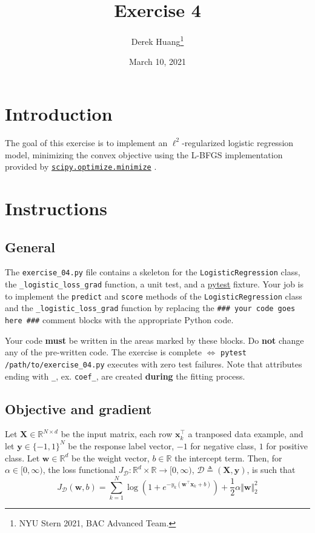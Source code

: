 \documentclass{article}
\title{Exercise 4}
\author{Derek Huang\thanks{NYU Stern 2021, BAC Advanced Team.}}
\date{March 10, 2021}
\numberwithin{equation}{section}
\newcommand{\pytest}{\href{https://docs.pytest.org/en/stable/}{pytest}}
\newcommand{\minimize}{%
    \href{%
        https://docs.scipy.org/doc/scipy/reference/generated/%
        scipy.optimize.minimize.html%
    }{\texttt{scipy.optimize.minimize}}%
}
\newcommand{\loglossgrad}{\texttt{\_logistic\_loss\_grad}}
\begin{document}
\maketitle
\thispagestyle{fancy}


\section{Introduction}

The goal of this exercise is to implement an $ \ell^2 $-regularized logistic
regression model, minimizing the convex objective using the L-BFGS
implementation provided by \minimize.

\section{Instructions}

\subsection{General}

The \texttt{exercise\_04.py} file contains a skeleton for the
\texttt{LogisticRegression} class, the \loglossgrad{} function, a unit test,
and a \pytest{} fixture. Your job is to implement the \texttt{predict} and \texttt{score} methods of the \texttt{LogisticRegression} class and the \loglossgrad{}
function by replacing the \texttt{\#\#\# your code goes here \#\#\#} comment
blocks with the appropriate Python code.

\medskip

Your code \textbf{must} be written in the areas marked by these blocks. Do
\textbf{not} change any of the pre-written code. The exercise is complete
$ \Leftrightarrow $ \texttt{pytest /path/to/exercise\_04.py} executes with
zero test failures. Note that attributes ending with \texttt{\_}, ex.
\texttt{coef\_}, are created \textbf{during} the fitting process.

\subsection{Objective and gradient}

Let $ \mathbf{X} \in \mathbb{R}^{N \times d} $ be the input matrix, each row
$ \mathbf{x}_k^\top $ a tranposed data example, and let $ \mathbf{y} \in
\{-1, 1\}^N $ be the response label vector, $ -1 $ for negative class, $ 1 $
for positive class. Let $ \mathbf{w} \in \mathbb{R}^d $ be the weight vector,
$ b \in \mathbb{R} $ the intercept term. Then, for $ \alpha \in [0, \infty) $,
the loss functional $ J_\mathcal{D} : \mathbb{R}^d \times \mathbb{R}
\rightarrow [0, \infty) $, $ \mathcal{D} \triangleq
(\mathbf{X}, \mathbf{y}) $, is such that
\begin{equation} \label{logreg_obj}
    J_\mathcal{D}(\mathbf{w}, b) = \sum_{k = 1}^N\log\left(
        1 + e^{-y_k(\mathbf{w}^\top\mathbf{x}_k + b)}
    \right) + \frac{1}{2}\alpha\Vert\mathbf{w}\Vert_2^2
\end{equation}
\end{document}
